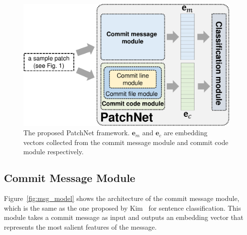 \begin{figure}[!t]
	\center
	\includegraphics[scale=0.37]{figures/framework_overall_ver1.pdf}
	\caption{The proposed PatchNet framework. $\textbf{e}_m$ and $\textbf{e}_c$ are embedding vectors collected from the commit message module and commit code module respectively.}
	\label{fig:patchnet}
    \vspace{-0.4cm}
\end{figure}

\subsection{Commit Message Module}
\label{sec:commit_msg_model}



Figure~\ref{fig:msg_model} shows the architecture
of the commit message module, which is the same as the one proposed by Kim~\cite{kim2014convolutional} for sentence classification. This module takes a commit message as input and outputs an embedding vector that represents the most salient features of the message.


